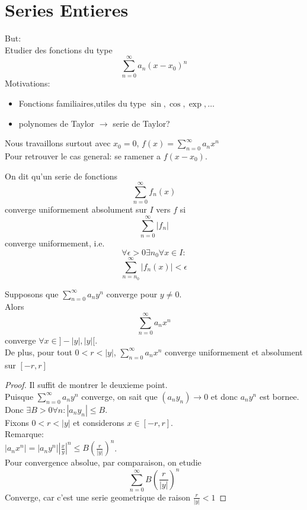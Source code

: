 \documentclass[../main.tex]{subfiles}
\begin{document}
\section{Series Entieres}
But:\\
Etudier des fonctions du type
\[ 
	\sum_{n=0}^{ \infty } a_n ( x-x_0) ^{n}
\]
Motivations:\\
\begin{itemize}
\item Fonctions familiaires,utiles du type $\sin,\cos,\exp,\ldots$ 
\item polynomes de Taylor $\rightarrow$ serie de Taylor?
\end{itemize}
\begin{rmq}
	Nous travaillons surtout avec $x_0=0$, $f( x) = \sum_{n=0}^{ \infty } a_n x^{n}$ \\
	Pour retrouver le cas general:
	se ramener a $f( x-x_0) $.
\end{rmq}
\begin{defn}
On dit qu'un serie de fonctions 
\[ 
	\sum_{n=0}^{ \infty } f_n( x) 
\]
converge uniformement absolument sur  $I$ vers $f$ si
\[ 
	\sum_{n=0}^{ \infty } |f_n|
\]
converge uniformement, i.e.
\[ 
\forall \epsilon > 0 \exists n_0 \forall x \in I:
\]
\[ 
	\sum_{n=n_0}^{ \infty } | f_n( x) | < \epsilon
\]

\end{defn}
\begin{thm}
Supposons que $ \sum_{n=0}^{ \infty } a_n y^{n}$ converge pour $y\neq 0$.\\
Alors
\[ 
\sum_{n=0}^{ \infty } a_n x^{n}
\]
converge $\forall x \in ] - |y|,|y|[$.\\
De plus, pour tout $ 0< r< |y|$, $ \sum_{n=0}^{ \infty }a_n x^{n}$ converge uniformement et absolument sur $[-r,r]$
\end{thm}
\begin{proof}
Il suffit de montrer le deuxieme point.\\
Puisque $ \sum_{n=0}^{ \infty } a_n y^{n}$ converge, on sait que $( a_n y_n) \to 0$ et donc $a_n y^{n}$ est bornee. Donc $\exists B> 0 \forall n: |a_n y_n| \leq B$.\\
Fixons $0< r<|y|$ et considerons $x \in [ -r,r] $.\\
Remarque:\\
$|a_n x^{n}| = |a_n y^{n}| | \frac{x}{y}|^{n} \leq B( \frac{r}{|y|}) ^{n}$.\\
Pour convergence absolue, par comparaison, on etudie
\[ 
	\sum_{n=0}^{ \infty } B ( \frac{r}{|y|}) ^{n}
\]
Converge, car c'est une serie geometrique de raison $\frac{r}{|y|}< 1$	
\end{proof}
\end{document}
